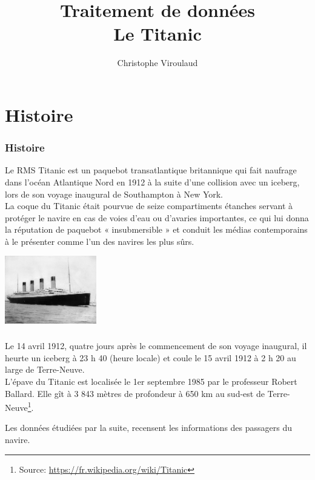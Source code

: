 \documentclass[svgnames,11pt]{beamer}
\author[]{Christophe Viroulaud}
\title{Traitement de données\\Le Titanic}
\date{\framebox{\textbf{Donn 01}}}
\institute{Seconde - SNT}
\begin{document}
\begin{frame}
    \titlepage
\end{frame}
\section{Histoire}
\begin{frame}
    \frametitle{Histoire}
    Le RMS Titanic est un paquebot transatlantique britannique qui fait naufrage dans l'océan Atlantique Nord en 1912 à la suite d'une collision avec un iceberg, lors de son voyage inaugural de Southampton à New York.\\ La coque du Titanic était pourvue de seize compartiments étanches servant à protéger le navire en cas de voies d'eau ou d'avaries importantes, ce qui lui donna la réputation de paquebot « insubmersible » et conduit les médias contemporains à le présenter comme l'un des navires les plus sûrs.
    \begin{center}
        \centering
        \includegraphics[width=4cm]{ressources/titanic.jpg}
        \label{IMG}
    \end{center}
\end{frame}
\begin{frame}
    \frametitle{}

    Le 14 avril 1912, quatre jours après le commencement de son voyage inaugural, il heurte un iceberg à 23 h 40 (heure locale) et coule le 15 avril 1912 à 2 h 20 au large de Terre-Neuve.\\
    L'épave du Titanic est localisée le 1er septembre 1985 par le professeur Robert Ballard. Elle gît à 3 843 mètres de profondeur à 650 km au sud-est de Terre-Neuve\footnote{Source: \url{https://fr.wikipedia.org/wiki/Titanic}}.

    Les données étudiées par la suite, recensent les informations des passagers du navire.
\end{frame}
\end{document}
